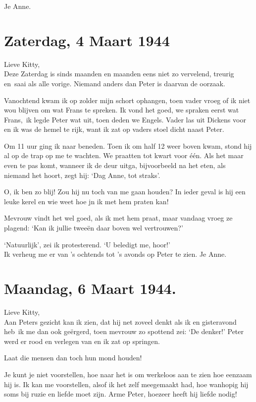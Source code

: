 \documentclass{book}
\begin{document}
Je Anne.

\chapter{Zaterdag, 4 Maart 1944}

Lieve Kitty,\\Deze Zaterdag is sinds maanden en maanden eens niet zo
vervelend, treurig en~saai als alle vorige. Niemand anders dan Peter is
daarvan de oorzaak.

Vanochtend kwam ik op zolder mijn schort ophangen, toen vader vroeg of
ik niet wou blijven om wat Frans te spreken. Ik vond het goed, we
spraken eerst wat Frans,~ik legde Peter wat uit, toen deden we Engels.
Vader las uit Dickens voor en ik was de hemel te rijk, want ik zat op
vaders stoel dicht naast Peter.

Om 11 uur ging ik naar beneden. Toen ik om half 12 weer boven kwam,
stond hij al op de trap op me te wachten. We praatten tot kwart voor
één. Als het maar even te pas komt, wanneer ik de deur uitga,
bijvoorbeeld na het eten, als niemand het hoort, zegt hij: `Dag Anne,
tot straks'.

O, ik ben zo blij! Zou hij nu toch van me gaan houden? In ieder geval is
hij een leuke kerel en wie weet hoe jn ik met hem praten kan!

Mevrouw vindt het wel goed, als ik met hem praat, maar vandaag vroeg ze
plagend: `Kan ik jullie tweeën daar boven wel vertrouwen?'

`Natuurlijk', zei ik protesterend. `U beledigt me, hoor!'\\Ik verheug me
er van 's ochtends tot 's avonds op Peter te zien. Je Anne.

\chapter{Maandag, 6 Maart 1944.}

Lieve Kitty,\\Aan Peters gezicht kan ik zien, dat hij net zoveel denkt
als ik en gisteravond heb~ik me dan ook geërgerd, toen mevrouw zo
spottend zei: `De denker!' Peter werd er rood en verlegen van en ik zat
op springen.

Laat die mensen dan toch hun mond houden!

Je kunt je niet voorstellen, hoe naar het is om werkeloos aan te zien
hoe eenzaam hij is. Ik kan me voorstellen, alsof ik het zelf meegemaakt
had, hoe wanhopig hij soms bij ruzie en liefde moet zijn. Arme Peter,
hoezeer heeft hij liefde nodig!
\end{document}
